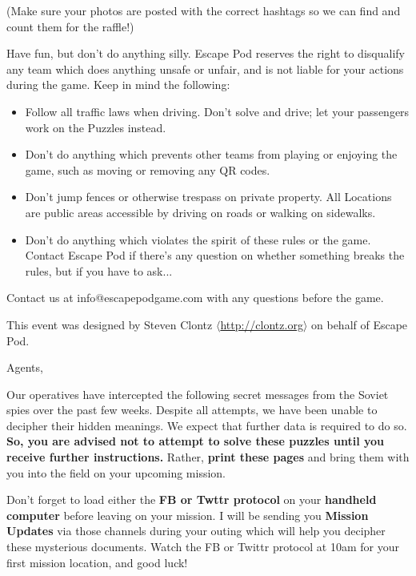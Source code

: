 \documentclass{puzzlehunt}
\begin{document}
(Make sure your photos are posted with the correct hashtags so we can find
and count them for the raffle!)


Have fun, but don't do anything silly. Escape Pod reserves the right to
disqualify any team which does anything unsafe or unfair, and is not liable
for your actions during the game. Keep in mind the following:

\begin{itemize}
  \item Follow all traffic laws when driving. Don't solve and drive; let your
    passengers work on the Puzzles instead.
  \item Don't do anything which prevents other teams from playing or enjoying
    the game, such as moving or removing any QR codes.
  \item Don't jump fences or otherwise trespass on private property. All
    Locations are public areas accessible by driving on roads or walking on
    sidewalks.
  \item Don't do anything which violates the spirit of these rules or the game.
    Contact Escape Pod if there's any question on whether something breaks
    the rules, but if you have to ask...
\end{itemize}


Contact us at info@escapepodgame.com with any questions before the game.

\vfill

{\footnotesize This event was designed by Steven Clontz
\(\langle\)\url{http://clontz.org}\(\rangle\) on behalf of Escape Pod.}



\noindent Agents,

Our operatives have intercepted the following secret messages from the
Soviet spies over the past few weeks. Despite all attempts, we have been
unable to decipher their hidden meanings. We expect that further data
is required to do so.
\textbf{So, you are advised not to attempt to solve these puzzles until you
receive further instructions.} Rather, \textbf{print these pages} and
bring them with you into the field on your upcoming mission.

Don't forget to load either the \textbf{FB or Twttr protocol} on your
\textbf{handheld computer} before leaving on your mission. I will be sending
you \textbf{Mission Updates} via those channels during your outing which
will help you decipher these mysterious documents. Watch the FB or Twittr
protocol at 10am for your first mission location, and good luck!
\end{document}
